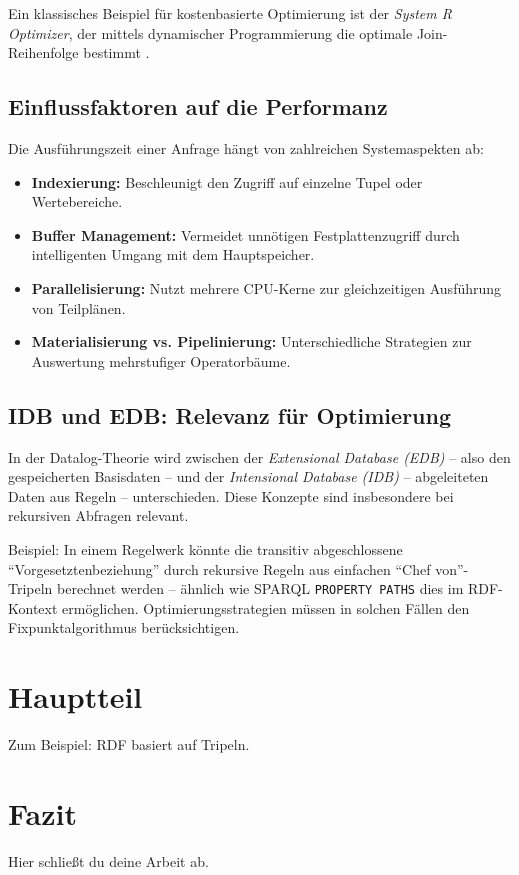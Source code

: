 \documentclass[12pt]{article}
\begin{document}
Ein klassisches Beispiel für kostenbasierte Optimierung ist der \emph{System R Optimizer}, der mittels dynamischer Programmierung die optimale Join-Reihenfolge bestimmt \cite{selinger1979access}.

\subsection{Einflussfaktoren auf die Performanz}

Die Ausführungszeit einer Anfrage hängt von zahlreichen Systemaspekten ab:

\begin{itemize}
    \item \textbf{Indexierung:} Beschleunigt den Zugriff auf einzelne Tupel oder Wertebereiche.
    \item \textbf{Buffer Management:} Vermeidet unnötigen Festplattenzugriff durch intelligenten Umgang mit dem Hauptspeicher.
    \item \textbf{Parallelisierung:} Nutzt mehrere CPU-Kerne zur gleichzeitigen Ausführung von Teilplänen.
    \item \textbf{Materialisierung vs. Pipelinierung:} Unterschiedliche Strategien zur Auswertung mehrstufiger Operatorbäume.
\end{itemize}

\subsection{IDB und EDB: Relevanz für Optimierung}

In der Datalog-Theorie wird zwischen der \emph{Extensional Database (EDB)} – also den gespeicherten Basisdaten – und der \emph{Intensional Database (IDB)} – abgeleiteten Daten aus Regeln – unterschieden. Diese Konzepte sind insbesondere bei rekursiven Abfragen relevant.

Beispiel: In einem Regelwerk könnte die transitiv abgeschlossene ``Vorgesetztenbeziehung'' durch rekursive Regeln aus einfachen ``Chef von''-Tripeln berechnet werden – ähnlich wie SPARQL \texttt{PROPERTY PATHS} dies im RDF-Kontext ermöglichen. Optimierungsstrategien müssen in solchen Fällen den Fixpunktalgorithmus berücksichtigen.



\section{Hauptteil}
Zum Beispiel: RDF basiert auf Tripeln.

\section{Fazit}
Hier schließt du deine Arbeit ab.

\printbibliography
\end{document}
